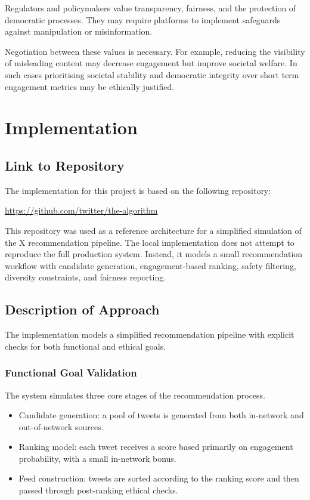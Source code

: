 \documentclass[]
{UCD_CS_41820_Report}
\begin{document}
Regulators and policymakers value transparency, fairness, and the protection of democratic 
processes. They may require platforms to implement safeguards against manipulation or 
misinformation.

Negotiation between these values is necessary. For example, reducing the visibility of misleading 
content may decrease engagement but improve societal welfare. In such cases prioritising societal 
stability and democratic integrity over short term engagement metrics may be ethically justified.


\chapter{Implementation}

\section{Link to Repository}

The implementation for this project is based on the following repository:

\url{https://github.com/twitter/the-algorithm}

This repository was used as a reference architecture for a simplified simulation of the X recommendation pipeline. The local implementation does not attempt to reproduce the full production system. Instead, it models a small recommendation workflow with candidate generation, engagement-based ranking, safety filtering, diversity constraints, and fairness reporting.

\section{Description of Approach}

The implementation models a simplified recommendation pipeline with explicit checks for both functional and ethical goals.

\subsection{Functional Goal Validation}

The system simulates three core stages of the recommendation process.

\begin{itemize}
\item Candidate generation: a pool of tweets is generated from both in-network and out-of-network sources.
\item Ranking model: each tweet receives a score based primarily on engagement probability, with a small in-network bonus.
\item Feed construction: tweets are sorted according to the ranking score and then passed through post-ranking ethical checks.
\end{itemize}
\end{document}

